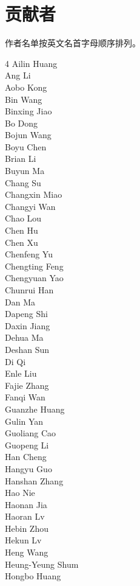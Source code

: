 \section*{贡献者}
作者名单按英文名首字母顺序排列。
\begin{multicols}{4}
Ailin Huang \\
Ang Li \\
Aobo Kong \\
Bin Wang \\
Binxing Jiao \\
Bo Dong \\
Bojun Wang \\
Boyu Chen \\
Brian Li \\
Buyun Ma \\
Chang Su \\
Changxin Miao \\
Changyi Wan \\
Chao Lou \\
Chen Hu \\
Chen Xu \\
Chenfeng Yu \\
Chengting Feng \\
Chengyuan Yao \\
Chunrui Han \\
Dan Ma \\
Dapeng Shi \\
Daxin Jiang \\
Dehua Ma \\
Deshan Sun \\
Di Qi \\
Enle Liu \\
Fajie Zhang \\
Fanqi Wan \\
Guanzhe Huang \\
Gulin Yan \\
Guoliang Cao \\
Guopeng Li \\
Han Cheng \\
Hangyu Guo \\
Hanshan Zhang \\
Hao Nie \\
Haonan Jia \\
Haoran Lv \\
Hebin Zhou \\
Hekun Lv \\
Heng Wang \\
Heung-Yeung Shum \\
Hongbo Huang \\

\end{multicols}
